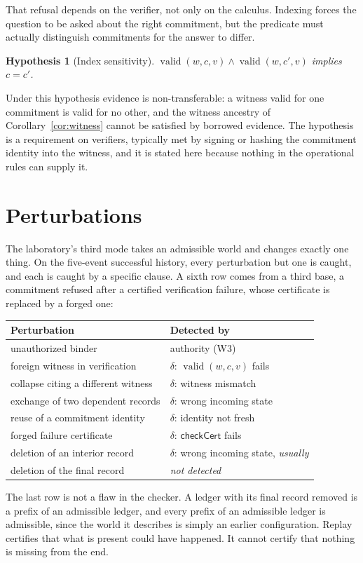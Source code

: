 \documentclass[11pt,openany]{book}
\newtheorem{hypothesis}[theorem]{Hypothesis}
\theoremstyle{remark}
\newcommand{\valid}{\operatorname{valid}}
\begin{document}
That refusal depends on the verifier, not only on the calculus. Indexing
forces the question to be asked about the right commitment, but the
predicate must actually distinguish commitments for the answer to differ.

\begin{hypothesis}[Index sensitivity]\label{hyp:index}
$\valid(w,c,v)\wedge\valid(w,c',v)$ implies $c=c'$.
\end{hypothesis}

Under this hypothesis evidence is non-transferable: a witness valid for
one commitment is valid for no other, and the witness ancestry of
Corollary~\ref{cor:witness} cannot be satisfied by borrowed evidence. The
hypothesis is a requirement on verifiers, typically met by signing or
hashing the commitment identity into the witness, and it is stated here
because nothing in the operational rules can supply it.

\section{Perturbations}

The laboratory's third mode takes an admissible world and changes exactly
one thing. On the five-event successful history, every perturbation but
one is caught, and each is caught by a specific clause. A sixth row comes
from a third base, a commitment refused after a certified verification
failure, whose certificate is replaced by a forged one:
\begin{center}
\small
\begin{tabular}{ll}
\toprule
Perturbation & Detected by\\
\midrule
unauthorized binder & authority (W3)\\
foreign witness in verification & $\delta$: $\valid(w,c,v)$ fails\\
collapse citing a different witness & $\delta$: witness mismatch\\
exchange of two dependent records & $\delta$: wrong incoming state\\
reuse of a commitment identity & $\delta$: identity not fresh\\
forged failure certificate & $\delta$: $\mathsf{checkCert}$ fails\\
deletion of an interior record & $\delta$: wrong incoming state, \emph{usually}\\
deletion of the final record & \emph{not detected}\\
\bottomrule
\end{tabular}
\end{center}
The last row is not a flaw in the checker. A ledger with its final record
removed is a prefix of an admissible ledger, and every prefix of an
admissible ledger is admissible, since the world it describes is simply an
earlier configuration. Replay certifies that what is present could have
happened. It cannot certify that nothing is missing from the end.
\end{document}
